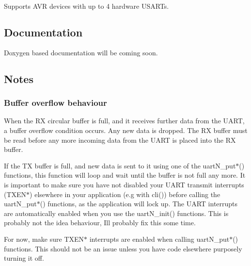 Supports A\+V\+R devices with up to 4 hardware U\+S\+A\+R\+Ts.

\subsection*{Documentation}

Doxygen based documentation will be coming soon.

\subsection*{Notes}

\subsubsection*{Buffer overflow behaviour}

When the R\+X circular buffer is full, and it receives further data from the U\+A\+R\+T, a buffer overflow condition occurs. Any new data is dropped. The R\+X buffer must be read before any more incoming data from the U\+A\+R\+T is placed into the R\+X buffer.

If the T\+X buffer is full, and new data is sent to it using one of the {\ttfamily uart\+N\+\_\+put$\ast$()} functions, this function will loop and wait until the buffer is not full any more. It is important to make sure you have not disabled your U\+A\+R\+T transmit interrupts ({\ttfamily T\+X\+E\+N$\ast$}) elsewhere in your application (e.\+g with {\ttfamily cli()}) before calling the {\ttfamily uart\+N\+\_\+put$\ast$()} functions, as the application will lock up. The U\+A\+R\+T interrupts are automatically enabled when you use the {\ttfamily uart\+N\+\_\+init()} functions. This is probably not the idea behaviour, I\textquotesingle{}ll probably fix this some time.

For now, make sure {\ttfamily T\+X\+E\+N$\ast$} interrupts are enabled when calling {\ttfamily uart\+N\+\_\+put$\ast$()} functions. This should not be an issue unless you have code elsewhere purposely turning it off. 